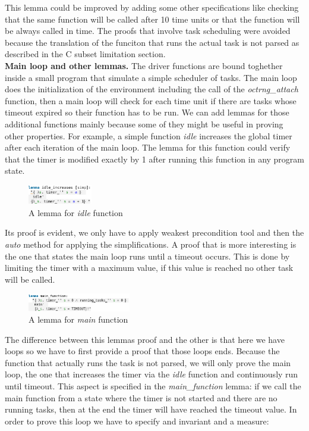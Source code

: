 \documentclass[conference]{IEEEtran}
\begin{document}
This lemma could be improved by adding some other specifications like checking that the same function will be called after 10 time units or that the function will be always called in time. The proofs that involve task scheduling were avoided because the translation of the funciton that runs the actual task is not parsed as described in the C subset limitation section.\\
\textbf{Main loop and other lemmas.}
The driver functions are bound toghether inside a small program that simulate a simple scheduler of tasks. The main loop does the initialization of the environment including the call of the \textit{octrng\_attach} function, then a main loop will check for each time unit if there are tasks whose timeout expired so their function has to be run. We can add lemmas for those additional functions mainly because some of they might be useful in proving other properties. For example, a simple function \textit{idle} increases the global timer after each iteration of the main loop. The lemma for this function could verify that the timer is modified exactly by 1 after running this function in any program state.
\begin{figure}[htbp]
\centerline{\includegraphics[width=0.25\textwidth]{idle_lemma.png}}
\caption{A lemma for \textit{idle} function} 
\label{fig}
\end{figure}
Its proof is evident, we only have to apply weakest precondition tool and then the \textit{auto} method for applying the simplifications. A proof that is more interesting is the one that states the main loop runs until a timeout occurs. This is done by limiting the timer with a maximum value, if this value is reached no other task will be called. 
\begin{figure}[htbp]
\centerline{\includegraphics[width=0.4\textwidth]{main_lemma.png}}
\caption{A lemma for \textit{main} function} 
\label{fig}
\end{figure}
The difference between this lemma\textquotesingle s proof and the other is that here we have loops so we have to first provide a proof that those loops ends. Because the function that actually runs the task is not parsed, we will only prove the main loop, the one that increases the timer via the \textit{idle} function and continuously run until timeout. This aspect is specified in the \textit{main\_function} lemma: if we call the main function from a state where the timer is not started and there are no running tasks, then at the end the timer will have reached the timeout value. In order to prove this loop we have to specify and invariant and a measure: 
\end{document}
